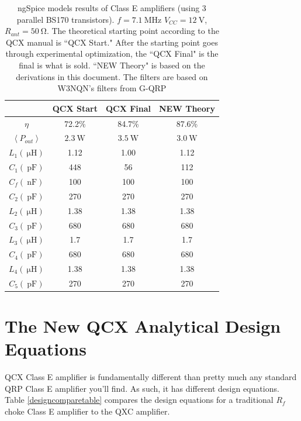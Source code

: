 \documentclass[10pt,letterpaper]{article}
\begin{document}
\begin{table}
\centering
\begin{tabular}{c|ccc}
& QCX Start & QCX Final & NEW Theory  \\
\hline
\hline 
$\eta$ & 72.2\% & 84.7\% & 87.6\% \\ \hline
$\left\langle P_{out} \right\rangle$ & $\SI{2.3}{\watt}$ & $\SI{3.5}{\watt}$ & $\SI{3.0}{\watt}$ \\ \hline
$L_1 (\SI{}{\micro\henry})$ & 1.12 & 1.00 & 1.12 \\\hline
$C_1 (\SI{}{\pico\farad})$ & 448 & 56 & 112 \\ \hline
$C_f (\SI{}{\nano\farad})$ & 100 & 100 & 100 \\ \hline
$C_2 (\SI{}{\pico\farad})$ & 270 & 270 & 270 \\ \hline
$L_2 (\SI{}{\micro\henry})$ & 1.38 & 1.38 & 1.38 \\ \hline
$C_3 (\SI{}{\pico\farad})$ & 680 & 680 & 680 \\ \hline
$L_3 (\SI{}{\micro\henry})$ & 1.7 & 1.7 & 1.7\\ \hline
$C_4 (\SI{}{\pico\farad})$ & 680 & 680 & 680 \\ \hline
$L_4 (\SI{}{\micro\henry})$ & 1.38 & 1.38 & 1.38 \\ \hline
$C_5 (\SI{}{\pico\farad})$ & 270 & 270 & 270 \\ \hline
\end{tabular}
\caption{ngSpice models results of Class E amplifiers (using 3 parallel BS170 transistors). $f=\SI{7.1}{\mega\hertz}$ $V_{CC}=\SI{12}{\volt}$, $R_{ant}=\SI{50}{\ohm}$. The theoretical starting point according to the QCX manual is ``QCX Start." After the starting point goes through experimental optimization, the ``QCX Final" is the final is what is sold. ``NEW Theory" is based on the derivations in this document. The filters are based on W3NQN's filters from G-QRP}\label{qcxtable}
\end{table}

\section{The New QCX Analytical Design Equations}
QCX Class E amplifier is fundamentally different than pretty much any standard QRP Class E amplifier you'll find. As such, it has different design equations. Table \ref{designcomparetable} compares the design equations for a traditional $R_f$ choke Class E amplifier to the QXC amplifier.
\end{document}
